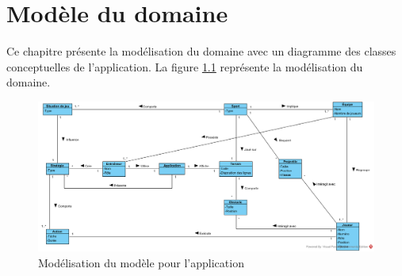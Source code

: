 
\chapter{Modèle du domaine}
\label{s:modele_domaine}

Ce chapitre présente la modélisation du domaine avec un diagramme des classes conceptuelles de l'application.
La figure \ref{fig:conceptuel_diag} représente la modélisation du domaine.

\begin{figure}[htpb]
    \centering
    \includegraphics[scale=0.6]{fig/conceptuel_diag.png}
    \caption{Modélisation du modèle pour l'application}
    \label{fig:conceptuel_diag}
\end{figure}
